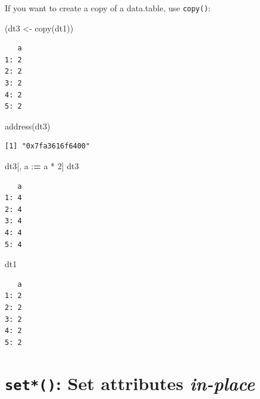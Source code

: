 \documentclass[
]{book}
\makeatletter
\newenvironment{Shaded}{\begin{snugshade}}{\end{snugshade}}
\newcommand{\DecValTok}[1]{\textcolor[rgb]{0.00,0.00,0.81}{#1}}
\newcommand{\ErrorTok}[1]{\textcolor[rgb]{0.64,0.00,0.00}{\textbf{#1}}}
\newcommand{\FunctionTok}[1]{\textcolor[rgb]{0.00,0.00,0.00}{#1}}
\newcommand{\NormalTok}[1]{#1}
\newcommand{\OtherTok}[1]{\textcolor[rgb]{0.56,0.35,0.01}{#1}}
\newcommand{\SpecialCharTok}[1]{\textcolor[rgb]{0.00,0.00,0.00}{#1}}
\newenvironment{kframe}{%
\medskip{}
\setlength{\fboxsep}{.8em}
 \def\at@end@of@kframe{}%
 \ifinner\ifhmode%
  \def\at@end@of@kframe{\end{minipage}}%
  \begin{minipage}{\columnwidth}%
 \fi\fi%
 \def\FrameCommand##1{\hskip\@totalleftmargin \hskip-\fboxsep
 \colorbox{shadecolor}{##1}\hskip-\fboxsep
     \hskip-\linewidth \hskip-\@totalleftmargin \hskip\columnwidth}%
 \MakeFramed {\advance\hsize-\width
   \@totalleftmargin\z@ \linewidth\hsize
   \@setminipage}}%
 {\par\unskip\endMakeFramed%
 \at@end@of@kframe}
\newenvironment{rmdblock}[1]
  {
  \begin{itemize}
  \renewcommand{\labelitemi}{
    \raisebox{-.7\height}[0pt][0pt]{
      {\setkeys{Gin}{width=3em,keepaspectratio}\texttt{[image: images/\#1]}}
    }
  }
  \setlength{\fboxsep}{1em}
  \begin{kframe}
  \item
  }
  {
  \end{kframe}
  \end{itemize}
  }
\newenvironment{note}
  {\begin{rmdblock}{note}}
  {\end{rmdblock}}
\makeatother
\begin{document}
\begin{note}
If you want to create a copy of a data.table, use \texttt{copy()}:
\end{note}

\begin{Shaded}
\begin{Highlighting}[]
\NormalTok{(dt3 }\OtherTok{\textless{}{-}} \FunctionTok{copy}\NormalTok{(dt1))}
\end{Highlighting}
\end{Shaded}

\begin{verbatim}
   a
1: 2
2: 2
3: 2
4: 2
5: 2
\end{verbatim}

\begin{Shaded}
\begin{Highlighting}[]
\FunctionTok{address}\NormalTok{(dt3)}
\end{Highlighting}
\end{Shaded}

\begin{verbatim}
[1] "0x7fa3616f6400"
\end{verbatim}

\begin{Shaded}
\begin{Highlighting}[]
\NormalTok{dt3[, a }\SpecialCharTok{:}\ErrorTok{=}\NormalTok{ a }\SpecialCharTok{*} \DecValTok{2}\NormalTok{]}
\NormalTok{dt3}
\end{Highlighting}
\end{Shaded}

\begin{verbatim}
   a
1: 4
2: 4
3: 4
4: 4
5: 4
\end{verbatim}

\begin{Shaded}
\begin{Highlighting}[]
\NormalTok{dt1}
\end{Highlighting}
\end{Shaded}

\begin{verbatim}
   a
1: 2
2: 2
3: 2
4: 2
5: 2
\end{verbatim}

\hypertarget{set-set-attributes-in-place}{%
\section{\texorpdfstring{\texttt{set*()}: Set attributes \textbf{\emph{in-place}}}{set*(): Set attributes in-place}}\label{set-set-attributes-in-place}}
\end{document}

